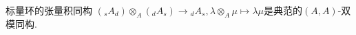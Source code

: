 \begin{corollary}{标量环的张量积同构}{}
	$\left(_{s}A_{d}\right)\otimes_{A}\left(_{d}A_{s}\right)\to {}_{d}A_{s},\lambda\otimes_{A}\mu\mapsto \lambda\mu$是典范的$\left(A,A\right)$-双模同构.
\end{corollary}




























































































